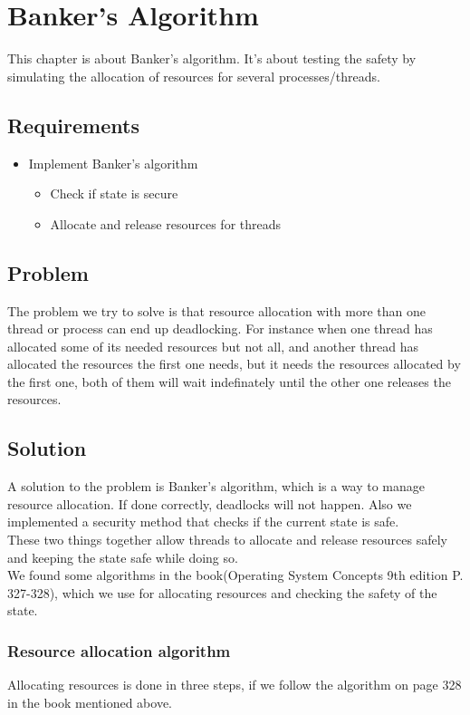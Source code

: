 \chapter{Banker's Algorithm}
This chapter is about Banker's algorithm. It's about testing the safety by simulating the allocation of resources for several processes/threads.

\section{Requirements}
\begin{itemize}
\item Implement Banker's algorithm
\begin{itemize}
\item Check if state is secure
\item Allocate and release resources for threads
\end{itemize}
\end{itemize}

\section{Problem}
The problem we try to solve is that resource allocation with more than one thread or process can end up deadlocking. For instance when one thread has allocated some of its needed resources but not all, and another thread has allocated the resources the first one needs, but it needs the resources allocated by the first one, both of them will wait indefinately until the other one releases the resources.

\section{Solution}
A solution to the problem is Banker's algorithm, which is a way to manage resource allocation. If done correctly, deadlocks will not happen. Also we implemented a security method that checks if the current state is safe.\\

These two things together allow threads to allocate and release resources safely and keeping the state safe while doing so.\\

We found some algorithms in the book(Operating System Concepts 9th edition P. 327-328), which we use for allocating resources and checking the safety of the state.

\subsection{Resource allocation algorithm}
Allocating resources is done in three steps, if we follow the algorithm on page 328 in the book mentioned above.\\

